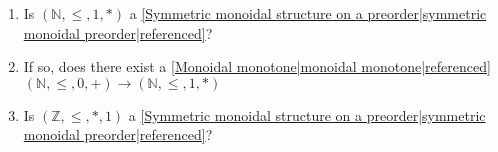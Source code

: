 
\begin{enumerate}
    \item  Is $(\mathbb{N},\leq,1,*)$ a \ref{Symmetric monoidal structure on a preorder|symmetric monoidal preorder|referenced}?
    \item If so, does there exist a \ref{Monoidal monotone|monoidal monotone|referenced} $(\mathbb{N},\leq,0,+) \rightarrow (\mathbb{N},\leq,1,*)$
    \item Is $(\mathbb{Z},\leq,*,1)$ a \ref{Symmetric monoidal structure on a preorder|symmetric monoidal preorder|referenced}?
  \end{enumerate}